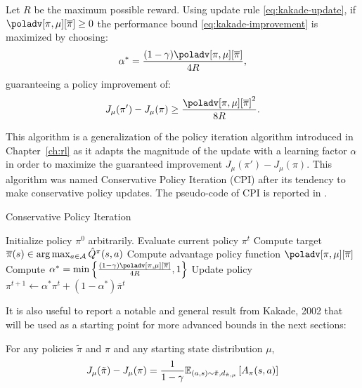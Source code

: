 \begin{theorem}
Let $R$ be the maximum possible reward. Using update rule \ref{eq:kakade-update}, if $\poladv[\pi, \mu][\overline{\pi}] \geq 0$ the performance bound \ref{eq:kakade-improvement} is maximized by choosing:
\begin{equation}
\alpha^* = \frac{(1-\gamma)\poladv[\pi, \mu][\overline{\pi}]}{4R},
\end{equation}
guaranteeing a policy improvement of:
\begin{equation}
J_{\mu}(\pi') - J_{\mu}(\pi) \geq \frac{{\poladv[\pi, \mu][\overline{\pi}]}^2}{8R}.
\end{equation}
\end{theorem}

This algorithm is a generalization of the policy iteration algorithm introduced in Chapter~\ref{ch:rl} as it adapts the magnitude of the update with a learning factor $\alpha$ in order to maximize the guaranteed improvement $J_\mu(\pi') - J_\mu(\pi)$. This algorithm was named Conservative Policy Iteration (CPI) after its tendency to make conservative policy updates. The pseudo-code of CPI is reported in . 

\begin{algorithm}[t]
\caption{Conservative Policy Iteration}\label{alg:kakade}
\begin{algorithmic}
\State Initialize policy $\pi^0$ arbitrarily.
\State Evaluate current policy $\pi^t$
\State Compute target $\overline{\pi}(s)\in\arg\max_{a\in\aspace}{\hat{Q}^\pi (s,a)}$
\State Compute advantage policy function $\poladv[\pi,\mu][\overline{\pi}]$
\State Compute $\alpha^* = \min\left\{ \frac{(1-\gamma)\poladv[\pi, \mu][\overline{\pi}]}{4R}, 1 \right\}$
\State Update policy $\pi^{t+1} \gets \alpha^* \pi^t + (1 - \alpha^*)\overline{\pi}^t$
\EndFor
\end{algorithmic}
\end{algorithm}

It is also useful to report a notable and general result from Kakade, 2002 that will be used as a starting point for more advanced bounds in the next sections: 
\begin{theorem}\label{th:kakade-lemma6.1}
For any policies $\tilde{\pi}$ and $\pi$ and any starting state distribution $\mu$,
\begin{equation}
J_{\mu}(\tilde{\pi}) - J_{\mu}(\pi) = \frac{1}{1-\gamma}\EV[(a,s)\sim\tilde{\pi}, d_{\tilde{\pi}, \mu}]{A_{\pi}(s,a)} 
\end{equation} 
\end{theorem}

